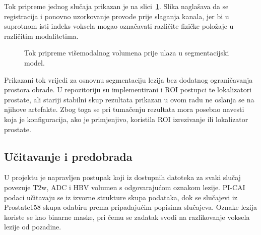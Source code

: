 \documentclass[a4paper,12pt,oneside]{article}
\begin{document}
Tok pripreme jednog slučaja prikazan je na slici~\ref{fig:data_flow}. Slika naglašava da se registracija i ponovno uzorkovanje provode prije slaganja kanala, jer bi u suprotnom isti indeks voksela mogao označavati različite fizičke položaje u različitim modalitetima.

\begin{figure}[H]
\centering
{}
\caption{Tok pripreme višemodalnog volumena prije ulaza u segmentacijski model. \label{fig:data_flow}}
\end{figure}

Prikazani tok vrijedi za osnovnu segmentaciju lezija bez dodatnog ograničavanja prostora obrade. U repozitoriju su implementirani i ROI postupci te lokalizatori prostate, ali stariji stabilni skup rezultata prikazan u ovom radu ne oslanja se na njihove artefakte. Zbog toga se pri tumačenju rezultata mora posebno navesti koja je konfiguracija, ako je primjenjivo, koristila ROI izrezivanje ili lokalizator prostate.

\subsection{Učitavanje i predobrada}

U projektu je napravljen postupak koji iz dostupnih datoteka za svaki slučaj povezuje T2w, ADC i HBV volumen s odgovarajućom oznakom lezije. PI-CAI podaci učitavaju se iz izvorne strukture skupa podataka, dok se slučajevi iz Prostate158 skupa odabiru prema pripadajućim popisima slučajeva. Oznake lezija koriste se kao binarne maske, pri čemu se zadatak svodi na razlikovanje voksela lezije od pozadine.
\end{document}
